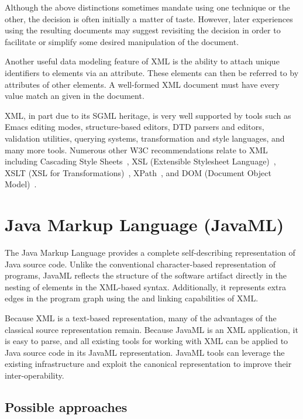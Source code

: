 \documentclass{article}
\begin{document}
\begin{multicols}{2}
\begin{itemize}
\end{itemize}

Although the above distinctions sometimes mandate using one technique or
the other, the decision is often initially a matter of taste.  However,
later experiences using the resulting documents may suggest revisiting
the decision in order to facilitate or simplify some desired
manipulation of the document.

Another useful data modeling feature of XML is the ability to attach
unique identifiers to elements via an  attribute.  These
elements can then be referred to by  attributes of other
elements.  A well-formed XML document must have every 
value match an  given in the document.

XML, in part due to its SGML heritage, is very well supported by tools
such as Emacs editing modes, structure-based editors, DTD parsers and
editors, validation utilities, querying systems, transformation and
style languages, and many more tools.  Numerous other W3C
recommendations relate to XML including Cascading Style
Sheets~\cite{CSS2}, XSL (Extensible Stylesheet Language)~\cite{XSL},
XSLT (XSL for Transformations)~\cite{XSLT}, XPath~\cite{XPath}, and DOM
(Document Object Model)~\cite{DOM}.

\section{Java Markup Language (JavaML)}
\label{sec-javaml}

The Java Markup Language provides a complete self-describing
representation of Java source code.  Unlike the conventional
character-based representation of programs, JavaML reflects the
structure of the software artifact directly in the nesting of elements
in the XML-based syntax.  Additionally, it represents extra edges in the 
program graph using the  and  linking
capabilities of XML.

Because XML is a text-based representation,
many of the advantages of the classical source representation remain.
Because JavaML is an XML application, it is easy to parse, and all
existing tools for working with XML can be applied to Java source code
in its JavaML representation.  JavaML tools can leverage the existing
infrastructure and exploit the canonical representation to improve
their inter-operability.

\subsection{Possible approaches}


\end{multicols}
\end{document}

